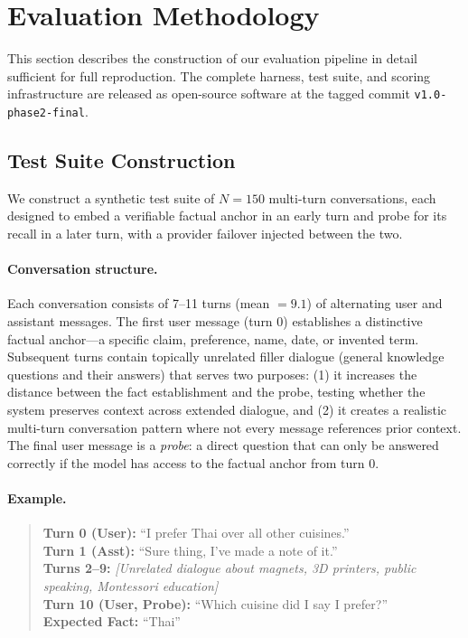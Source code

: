 \section{Evaluation Methodology}
\label{sec:experimental}

This section describes the construction of our evaluation pipeline in detail sufficient for full reproduction. The complete harness, test suite, and scoring infrastructure are released as open-source software at the tagged commit \texttt{v1.0-phase2-final}.

\subsection{Test Suite Construction}

We construct a synthetic test suite of $N=150$ multi-turn conversations, each designed to embed a verifiable factual anchor in an early turn and probe for its recall in a later turn, with a provider failover injected between the two.

\paragraph{Conversation structure.}
Each conversation consists of 7--11 turns (mean $= 9.1$) of alternating user and assistant messages. The first user message (turn 0) establishes a distinctive factual anchor---a specific claim, preference, name, date, or invented term. Subsequent turns contain topically unrelated filler dialogue (general knowledge questions and their answers) that serves two purposes: (1) it increases the distance between the fact establishment and the probe, testing whether the system preserves context across extended dialogue, and (2) it creates a realistic multi-turn conversation pattern where not every message references prior context. The final user message is a \textit{probe}: a direct question that can only be answered correctly if the model has access to the factual anchor from turn 0.

\paragraph{Example.}
\begin{quote}
\small
\textbf{Turn 0 (User):} ``I prefer Thai over all other cuisines.'' \\
\textbf{Turn 1 (Asst):} ``Sure thing, I've made a note of it.'' \\
\textbf{Turns 2--9:} \textit{[Unrelated dialogue about magnets, 3D printers, public speaking, Montessori education]} \\
\textbf{Turn 10 (User, Probe):} ``Which cuisine did I say I prefer?'' \\
\textbf{Expected Fact:} ``Thai''
\end{quote}

